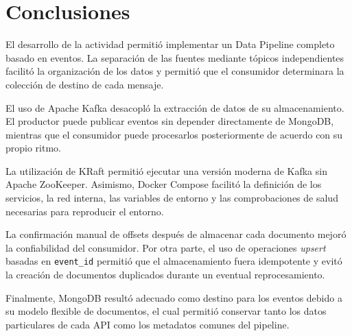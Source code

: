 \section{Conclusiones}

El desarrollo de la actividad permitió implementar un Data Pipeline completo
basado en eventos. La separación de las fuentes mediante tópicos independientes
facilitó la organización de los datos y permitió que el consumidor determinara
la colección de destino de cada mensaje.

El uso de Apache Kafka desacopló la extracción de datos de su almacenamiento.
El productor puede publicar eventos sin depender directamente de MongoDB,
mientras que el consumidor puede procesarlos posteriormente de acuerdo con su
propio ritmo.

La utilización de KRaft permitió ejecutar una versión moderna de Kafka sin
Apache ZooKeeper. Asimismo, Docker Compose facilitó la definición de los
servicios, la red interna, las variables de entorno y las comprobaciones de
salud necesarias para reproducir el entorno.

La confirmación manual de offsets después de almacenar cada documento mejoró
la confiabilidad del consumidor. Por otra parte, el uso de operaciones
\textit{upsert} basadas en \texttt{event\_id} permitió que el almacenamiento
fuera idempotente y evitó la creación de documentos duplicados durante un
eventual reprocesamiento.

Finalmente, MongoDB resultó adecuado como destino para los eventos debido a su
modelo flexible de documentos, el cual permitió conservar tanto los datos
particulares de cada API como los metadatos comunes del pipeline.